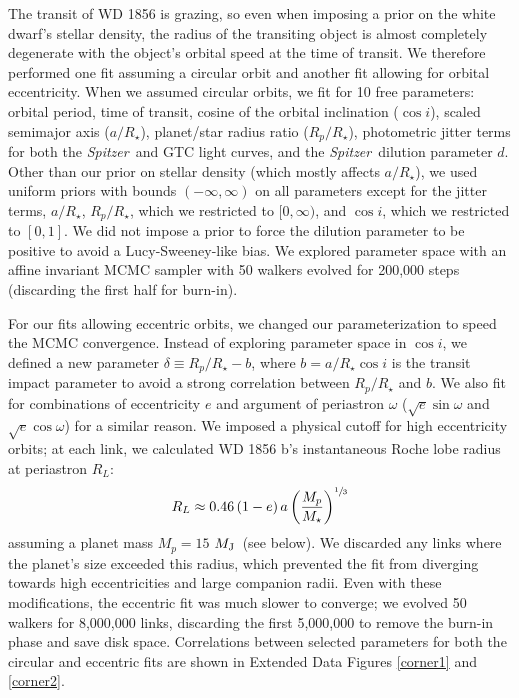 \documentclass{nature3}
\newcommand*{\bedit}{\textcolor{new_black}}
\newcommand{\mjup}{\ensuremath{M_{\rm J}}}
\newcommand{\project}[1]{\textsl{#1}}
\newcommand{\Spitzer}{\project{Spitzer}}
\begin{document}
\begin{methods}
The transit of WD 1856 is grazing, so even when imposing a prior on the white dwarf's stellar density, the radius of the transiting object is almost completely degenerate with the object's orbital speed at the time of transit. We therefore performed one fit assuming a circular orbit and another fit allowing for orbital eccentricity. When we assumed circular orbits, we fit for 10 free parameters: orbital period, time of transit, cosine of the orbital inclination ($\cos{i}$), scaled semimajor axis ($a/R_\star$), planet/star radius ratio ($R_p/R_\star$), photometric jitter terms for both the \Spitzer\ and GTC light curves, and the \Spitzer\ dilution parameter $d$. Other than our prior on stellar density (which mostly affects $a/R_\star$), we used uniform priors with bounds $(-\infty, \infty)$ on all parameters except for the jitter terms, $a/R_\star$, $R_p/R_\star$, which we restricted to $[0,\infty)$, and $\cos{i}$, which we restricted to $[0,1]$. We did not impose a prior to force the dilution parameter to be positive to avoid a Lucy-Sweeney-like\cite{lucysweeney} bias. We explored parameter space with an affine invariant MCMC sampler\cite{goodmanweare} with 50 walkers evolved for 200,000 steps (discarding the first half for burn-in). 

For our fits allowing eccentric orbits, we changed our parameterization to speed the MCMC convergence. Instead of exploring parameter space in $\cos{i}$, we defined a new parameter $\delta \equiv R_p/R_\star - b$, where $b = a/R_\star \cos{i}$ is the transit impact parameter to avoid a strong correlation between $R_p/R_\star$ and $b$. We also fit for combinations of eccentricity $e$ and argument of periastron $\omega$ ($\sqrt{e}\sin{\omega}$ and $\sqrt{e}\cos{\omega}$) for a similar reason. We imposed a physical cutoff for high eccentricity orbits; at each link, we calculated WD 1856 b's instantaneous Roche lobe radius\cite{kopal1959close} at periastron $R_L$: 
\begin{equation}
    R_L \approx 0.46\,(1-e)\,a\left( \frac{M_p}{M_\star}\right)^{\sfrac{1}{3}}
\end{equation}
assuming a planet mass $M_p = 15$ \mjup\ (see below). We discarded any links where the planet's size exceeded this radius, \bedit{which prevented the fit from diverging towards high eccentricities and large companion radii}. Even with these modifications, the eccentric fit was much slower to converge; we evolved 50 walkers for \bedit{8,000,000 links, discarding the first 5,000,000 to remove the burn-in phase and save disk space}. \bedit{Correlations between selected parameters for both the circular and eccentric fits are shown in Extended Data Figures  \ref{corner1} and \ref{corner2}.}


\end{methods}
\end{document}
